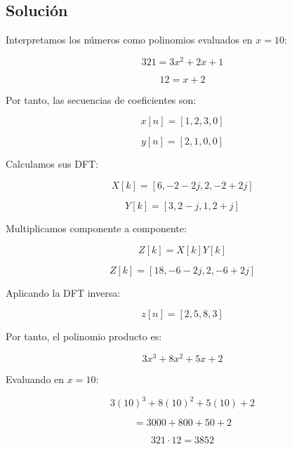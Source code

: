 \documentclass[fleqn]{article}
\begin{document}
	\subsection{Solución}

	Interpretamos los números como polinomios evaluados en $x=10$:

	\[
	321
	=
	3x^2+2x+1
	\]

	\[
	12
	=
	x+2
	\]

	Por tanto, las secuencias de coeficientes son:

	\[
	x[n]=[1,2,3,0]
	\]

	\[
	y[n]=[2,1,0,0]
	\]

	Calculamos sus DFT:

	\[
	\boxed{
	X[k]=[6,-2-2j,2,-2+2j]
	}
	\]

	\[
	\boxed{
	Y[k]=[3,2-j,1,2+j]
	}
	\]

	Multiplicamos componente a componente:

	\[
	Z[k]
	=
	X[k]Y[k]
	\]

	\[
	\boxed{
	Z[k]=[18,-6-2j,2,-6+2j]
	}
	\]

	Aplicando la DFT inversa:

	\[
	z[n]
	=
	[2,5,8,3]
	\]

	Por tanto, el polinomio producto es:

	\[
	3x^3+8x^2+5x+2
	\]

	Evaluando en $x=10$:

	\[
	3(10)^3+8(10)^2+5(10)+2
	\]

	\[
	=
	3000+800+50+2
	\]

	\[
	\boxed{
	321\cdot12=3852
	}
	\]

    
\end{document}
